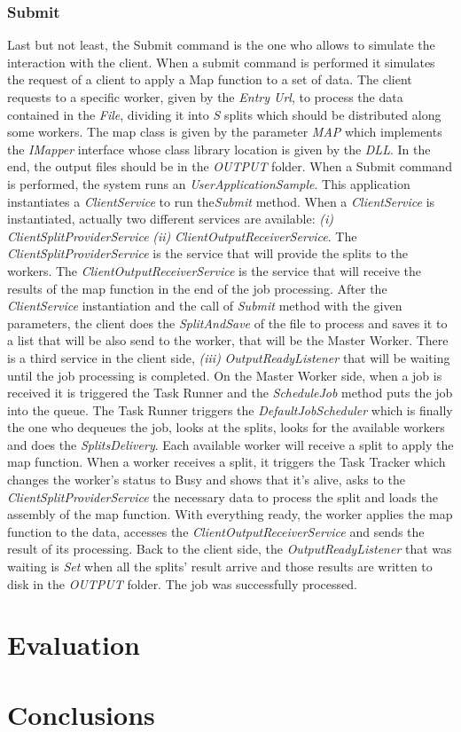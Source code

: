 \documentclass[times, 10pt,twocolumn]{article}
\begin{document}
            \subsubsection{Submit}
            Last but not least, the Submit command is the one who allows to simulate the interaction with the client. When a submit command is performed it simulates
            the request of a client to apply a Map function to a set of data. The client requests to a specific worker, given by the \emph{Entry Url}, 
            to process the data contained in the \emph{File}, dividing it into \emph{S} splits which should be distributed along some workers.
            The map class is given by the parameter \emph{MAP} which implements the \emph{IMapper} interface whose class library location is given by the \emph{DLL}.
            In the end, the output files should be in the \emph{OUTPUT} folder.
            When a Submit command is performed, the system runs an \emph{UserApplicationSample}. This application instantiates a \emph{ClientService} to run the\emph{Submit}
            method. When a \emph{ClientService} is instantiated, actually two different services are available: {\it (i)} \emph{ClientSplitProviderService} {\it (ii)} \emph{ClientOutputReceiverService}.
            The \emph{ClientSplitProviderService} is the service that will provide the splits to the workers. The \emph{ClientOutputReceiverService} is the service that will receive the results of the map function in the end of the job processing.
            After the \emph{ClientService} instantiation and the call of \emph{Submit} method with the given parameters, the client does the \emph{SplitAndSave}
            of the file to process and saves it to a list that will be also send to the worker, that will be the Master Worker.
            There is a third service in the client side, {\it (iii)} \emph{OutputReadyListener} that will be waiting until the job processing is completed.
            On the Master Worker side, when a job is received it is triggered the Task Runner and the \emph{ScheduleJob} method puts the job into the queue.
            The Task Runner triggers the \emph{DefaultJobScheduler} which is finally the one who dequeues the job, looks at the splits, looks for the available workers
            and does the \emph{SplitsDelivery}.
            Each available worker will receive a split to apply the map function. When a worker receives a split, it triggers the Task Tracker which changes the worker's status to
            Busy and shows that it's alive, asks to the \emph{ClientSplitProviderService} the necessary data to process the split and loads the assembly of the map function. 
            With everything ready, the worker applies the map function to the data, accesses the \emph{ClientOutputReceiverService} and sends the result of its processing.
            Back to the client side, the \emph{OutputReadyListener} that was waiting is \emph{Set} when all the splits' result arrive and those results are written to disk in the \emph{OUTPUT} folder.
            The job was successfully processed.
	\section{Evaluation}

	\section{Conclusions}

	
	
\end{document}
